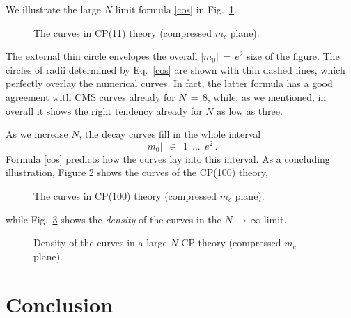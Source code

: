 \documentclass[epsfig,12pt]{article}
\def\beq{\begin{equation}}
\def\eeq{\end{equation}}
\def\beq{\begin{equation}}
\def\eeq{\end{equation}}
\begin{document}
	We illustrate the large $ N $ limit formula \eqref{cos} in Fig.~\ref{ccp11}.
\begin{figure}
\begin{center}
\epsfxsize=8.5cm
\caption{\small The curves in CP(11) theory (compressed $ m_c $ plane).}
\label{ccp11}
\end{center}
\end{figure}
	The external thin circle envelopes the overall $ |m_0| \,=\, e^2 $ size of the figure.
	The circles of radii determined by Eq.~\eqref{cos} are shown with thin dashed lines, which perfectly overlay
	the numerical curves. 
	In fact, the latter formula has a good agreement with CMS curves already for $ N \,=\, 8 $, while, as we mentioned,
	in overall it shows the right tendency already for $ N $ as low as three.


	As we increase $ N $, the decay curves fill in the whole interval 
\beq
	\big| m_0 \big| ~~\in~~ 1~~ ...~~e^2\,.
\eeq
	Formula \eqref{cos} predicts how the curves lay into this interval.
	As a concluding illustration, Figure \ref{ccp100} shows the curves of the CP(100) theory,
\begin{figure}
\begin{center}
\epsfxsize=7.5cm
\caption{\small The curves in CP(100) theory (compressed $ m_c $ plane).}
\label{ccp100}
\end{center}
\end{figure}
	while Fig.~\ref{cmsdense} shows the {\it density} of the curves in the $ N \,\to\, \infty $ limit.
\begin{figure}
\begin{center}
\epsfxsize=7.5cm
\caption{\small Density of the curves in a large $ N $ CP theory (compressed $ m_c $ plane).}
\label{cmsdense}
\end{center}
\end{figure}


\section{Conclusion}
\end{document}
